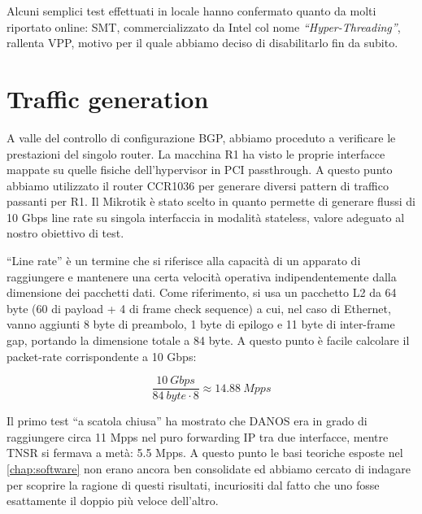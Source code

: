 Alcuni semplici test effettuati in locale hanno confermato quanto da molti riportato online: SMT, commercializzato da Intel col nome \textit{``Hyper-Threading''}, rallenta VPP, motivo per il quale abbiamo deciso di disabilitarlo fin da subito.

\section{Traffic generation}


A valle del controllo di configurazione BGP, abbiamo proceduto a verificare le prestazioni del singolo router. La macchina R1 ha visto le proprie interfacce mappate su quelle fisiche dell'hypervisor in PCI passthrough. A questo punto abbiamo utilizzato il router CCR1036 per generare diversi pattern di traffico passanti per R1. Il Mikrotik è stato scelto in quanto permette di generare flussi di 10 Gbps line rate su singola interfaccia in modalità stateless, valore adeguato al nostro obiettivo di test.

``Line rate'' è un termine che si riferisce alla capacità di un apparato di raggiungere e mantenere una certa velocità operativa indipendentemente dalla dimensione dei pacchetti dati. Come riferimento, si usa un pacchetto L2 da 64 byte (60 di payload + 4 di frame check sequence) a cui, nel caso di Ethernet, vanno aggiunti 8 byte di preambolo, 1 byte di epilogo e 11 byte di inter-frame gap, portando la dimensione totale a 84 byte. A questo punto è facile calcolare il packet-rate corrispondente a 10 Gbps:

\begin{equation} \label{eq:10g-line-rate}
    \frac{10\ Gbps}{84\ byte \cdot 8} \approx 14.88\ Mpps
\end{equation}

Il primo test ``a scatola chiusa'' ha mostrato che DANOS era in grado di raggiungere circa 11 Mpps nel puro forwarding IP tra due interfacce, mentre TNSR si fermava a metà: 5.5 Mpps. A questo punto le basi teoriche esposte nel \cref{chap:software} non erano ancora ben consolidate ed abbiamo cercato di indagare per scoprire la ragione di questi risultati, incuriositi dal fatto che uno fosse esattamente il doppio più veloce dell'altro.

